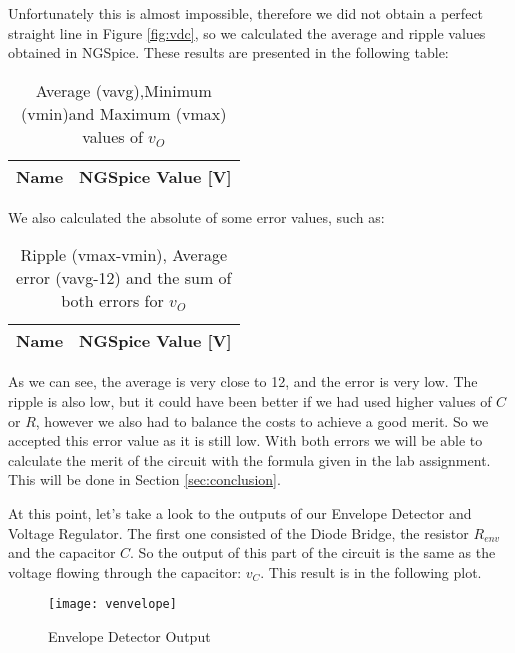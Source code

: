 Unfortunately this is almost impossible, therefore we did not obtain a perfect straight line in Figure \ref{fig:vdc}, so we calculated the average and ripple values obtained in NGSpice. These results are presented in the following table:

\FloatBarrier
\begin{table}[h]
	\centering
	\begin{tabular}{|l|r|}
		\hline    
		{\bf Name} & {\bf NGSpice Value [V]} \\ \hline
				
	\end{tabular}
	\caption{Average (vavg),Minimum (vmin)and Maximum (vmax) values of $v_{O}$}
	\label{tab:ngspice1}
\end{table}
\FloatBarrier

We also calculated the absolute of some error values, such as:
\FloatBarrier
\begin{table}[h]
	\centering
	\begin{tabular}{|l|r|}
		\hline    
		{\bf Name} & {\bf NGSpice Value [V]} \\ \hline
				
	\end{tabular}
	\caption{Ripple (vmax-vmin), Average error (vavg-12) and the sum of both errors for $v_{O}$}
	\label{tab:ngspice2}
\end{table}
\FloatBarrier

As we can see, the average is very close to 12, and the error is very low. The ripple is also low, but it could have been better if we had used higher values of $C$ or $R$, however we also had to balance the costs to achieve a good merit. So we accepted this error value as it is still low.
With both errors we will be able to calculate the merit of the circuit with the formula given in the lab assignment. This will be done in Section \ref{sec:conclusion}.


At this point, let's take a look to the outputs of our Envelope Detector and Voltage Regulator. The first one consisted of the Diode Bridge, the resistor $R_{env}$ and the capacitor $C$. So the output of this part of the circuit is the same as the voltage flowing through the capacitor: $v_{C}$. This result is in the following plot.

\FloatBarrier
\begin{figure}[h] 
	\centering
	\texttt{[image: venvelope]}
	\caption{Envelope Detector Output}
	\label{fig:venvelope}
\end{figure}
\FloatBarrier

